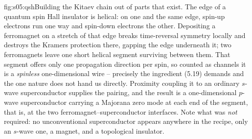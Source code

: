 %
\begin{aqmfigure}{fig:s05:qsh}{Building the Kitaev chain out of parts that exist. The edge of a
quantum spin Hall insulator is helical: on one and the same edge, spin-up electrons run one way and
spin-down electrons the other. Depositing a ferromagnet on a stretch of that edge breaks
time-reversal symmetry locally and destroys the Kramers protection there, gapping the edge
underneath it; two ferromagnets leave one short helical segment surviving between them. That
segment offers only one propagation direction per spin, so counted as channels it is a
\emph{spinless} one-dimensional wire -- precisely the ingredient (5.19) demands and the one nature
does not hand us directly. Proximity coupling it to an ordinary $s$-wave superconductor supplies
the pairing, and the result is a one-dimensional $p$-wave superconductor carrying a Majorana zero
mode at each end of the segment, that is, at the two ferromagnet--superconductor interfaces. Note
what was \emph{not} required: no unconventional superconductor appears anywhere in the recipe, only
an $s$-wave one, a magnet, and a topological insulator.}

\end{aqmfigure}
